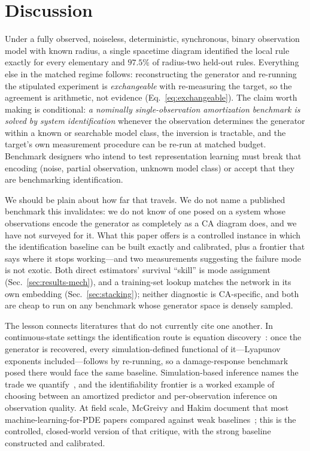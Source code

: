 \documentclass[aip,cha,amsmath,amssymb,reprint,floatfix]{revtex4-2}
\begin{document}
\section{Discussion}
\label{sec:discussion}

Under a fully observed, noiseless, deterministic, synchronous, binary
observation model with known radius, a single spacetime diagram identified
the local rule exactly for every elementary and $97.5\%$ of radius-two
held-out rules. Everything else in the matched regime follows: reconstructing
the generator and re-running the stipulated experiment is \emph{exchangeable}
with re-measuring the target, so the agreement is arithmetic, not evidence
(Eq.~\eqref{eq:exchangeable}). The claim worth making is conditional: \emph{a nominally
single-observation amortization benchmark is solved by system identification}
whenever the observation determines the generator within a known or searchable
model class, the inversion is tractable, and the target's own measurement
procedure can be re-run at matched budget. Benchmark designers who
intend to test representation learning must break that encoding (noise,
partial observation, unknown model class) or accept that they are benchmarking
identification.

We should be plain about how far that travels. We do not name a published
benchmark this invalidates: we do not know of one posed on a system whose
observations encode the generator as completely as a CA diagram does, and we
have not surveyed for it. What this paper offers is a controlled instance in
which the identification baseline can be built exactly and calibrated, plus a
frontier that says where it stops working---and two measurements suggesting
the failure mode is not exotic. Both direct estimators' survival ``skill'' is
mode assignment (Sec.~\ref{sec:results-mech}), and a training-set lookup
matches the network in its own embedding (Sec.~\ref{sec:stacking}); neither
diagnostic is CA-specific, and both are cheap to run on any benchmark whose
generator space is densely sampled.

The lesson connects literatures that do not currently cite one another. In
continuous-state settings the identification route is equation
discovery~\cite{brunton2016,schmidtlipson2009}: once the generator is
recovered, every simulation-defined functional of it---Lyapunov exponents
included---follows by re-running, so a damage-response benchmark posed there
would face the same baseline. Simulation-based inference names the trade we
quantify~\cite{cranmer2020}, and the identifiability frontier is a worked
example of choosing between an amortized predictor and per-observation
inference on observation quality. At field scale, McGreivy and Hakim document
that most machine-learning-for-PDE papers compared against weak
baselines~\cite{mcgreivy2024}; this is the controlled, closed-world version
of that critique, with the strong baseline constructed and calibrated.
\end{document}
